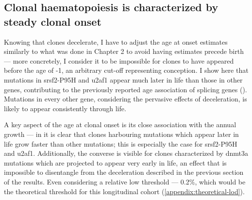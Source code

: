 \begin{figure}[!ht]
	\label{fig:historical-growth-representation}
\end{figure}

\begin{figure}[!ht]
	\label{fig:deceleration-figure-full}
\end{figure}

\begin{figure}[!ht]
	\label{fig:historical-growth-tally}
\end{figure}

\subsection{Clonal haematopoiesis is characterized by steady clonal onset}

Knowing that clones decelerate, I have to adjust the age at onset estimates similarly to what was done in Chapter 2 to avoid having estimates precede birth --- more concretely, I consider it to be impossible for clones to have appeared before the age of -1, an arbitrary cut-off representing conception. I show here that mutations in \ac{srsf2}-P95H and \ac{u2af1} appear much later in life than those in other genes, contributing to the previously reported age association of splicing genes \cite{McKerrell2015-rl} (). Mutations in every other gene, considering the pervasive effects of deceleration, is likely to appear consistently through life.

\begin{figure}[!ht]
	\label{fig:ages-at-onset}
\end{figure}

A key aspect of the age at clonal onset is its close association with the annual growth --- in  it is clear that clones harbouring mutations which appear later in life grow faster than other mutations; this is especially the case for \ac{srsf2}-P95H and \ac{u2af1}. Additionally, the converse is visible for clones characterized by \ac{dnmt3a} mutations which are projected to appear very early in life, an effect that is impossible to disentangle from the deceleration described in the previous section of the results. Even considering a relative low threshold --- 0.2\%, which would be the theoretical threshold for this longitudinal cohort (\autoref{appendix:theoretical-lod}).

